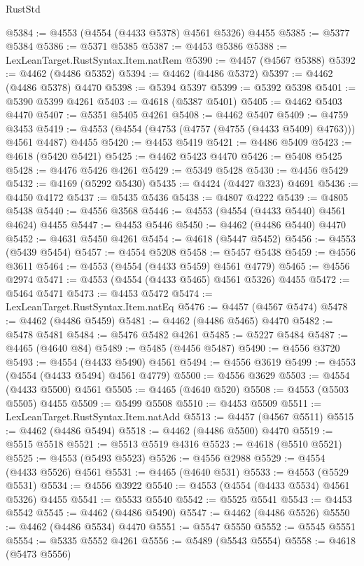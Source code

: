 \begin{lexlean}{RustStd}
\begin{coremodule}
@5384 := @4553 (@4554 (@4433 @5378) @4561 @5326) @4455
@5385 := @5377 @5384
@5386 := @5371 @5385
@5387 := @4453 @5386
@5388 := LexLeanTarget.RustSyntax.Item.natRem
@5390 := @4457 (@4567 @5388)
@5392 := @4462 (@4486 @5352)
@5394 := @4462 (@4486 @5372)
@5397 := @4462 (@4486 @5378) @4470
@5398 := @5394 @5397
@5399 := @5392 @5398
@5401 := @5390 @5399 @4261
@5403 := @4618 (@5387 @5401)
@5405 := @4462 @5403 @4470
@5407 := @5351 @5405 @4261
@5408 := @4462 @5407
@5409 := @4759 @3453
@5419 := @4553 (@4554 (@4753 (@4757 (@4755 (@4433 @5409) @4763))) @4561 @4487) @4455
@5420 := @4453 @5419
@5421 := @4486 @5409
@5423 := @4618 (@5420 @5421)
@5425 := @4462 @5423 @4470
@5426 := @5408 @5425
@5428 := @4476 @5426 @4261
@5429 := @5349 @5428
@5430 := @4456 @5429
@5432 := @4169 (@5292 @5430)
@5435 := @4424 (@4427 @323) @4691
@5436 := @4450 @4172
@5437 := @5435 @5436
@5438 := @4807 @4222
@5439 := @4805 @5438
@5440 := @4556 @3568
@5446 := @4553 (@4554 (@4433 @5440) @4561 @4624) @4455
@5447 := @4453 @5446
@5450 := @4462 (@4486 @5440) @4470
@5452 := @4631 @5450 @4261
@5454 := @4618 (@5447 @5452)
@5456 := @4553 (@5439 @5454)
@5457 := @4554 @5208
@5458 := @5457 @5438
@5459 := @4556 @3611
@5464 := @4553 (@4554 (@4433 @5459) @4561 @4779)
@5465 := @4556 @2974
@5471 := @4553 (@4554 (@4433 @5465) @4561 @5326) @4455
@5472 := @5464 @5471
@5473 := @4453 @5472
@5474 := LexLeanTarget.RustSyntax.Item.natEq
@5476 := @4457 (@4567 @5474)
@5478 := @4462 (@4486 @5459)
@5481 := @4462 (@4486 @5465) @4470
@5482 := @5478 @5481
@5484 := @5476 @5482 @4261
@5485 := @5227 @5484
@5487 := @4465 (@4640 @84)
@5489 := @5485 (@4456 @5487)
@5490 := @4556 @3720
@5493 := @4554 (@4433 @5490) @4561
@5494 := @4556 @3619
@5499 := @4553 (@4554 (@4433 @5494) @4561 @4779)
@5500 := @4556 @3629
@5503 := @4554 (@4433 @5500) @4561
@5505 := @4465 (@4640 @520)
@5508 := @4553 (@5503 @5505) @4455
@5509 := @5499 @5508
@5510 := @4453 @5509
@5511 := LexLeanTarget.RustSyntax.Item.natAdd
@5513 := @4457 (@4567 @5511)
@5515 := @4462 (@4486 @5494)
@5518 := @4462 (@4486 @5500) @4470
@5519 := @5515 @5518
@5521 := @5513 @5519 @4316
@5523 := @4618 (@5510 @5521)
@5525 := @4553 (@5493 @5523)
@5526 := @4556 @2988
@5529 := @4554 (@4433 @5526) @4561
@5531 := @4465 (@4640 @531)
@5533 := @4553 (@5529 @5531)
@5534 := @4556 @3922
@5540 := @4553 (@4554 (@4433 @5534) @4561 @5326) @4455
@5541 := @5533 @5540
@5542 := @5525 @5541
@5543 := @4453 @5542
@5545 := @4462 (@4486 @5490)
@5547 := @4462 (@4486 @5526)
@5550 := @4462 (@4486 @5534) @4470
@5551 := @5547 @5550
@5552 := @5545 @5551
@5554 := @5335 @5552 @4261
@5556 := @5489 (@5543 @5554)
@5558 := @4618 (@5473 @5556)

\end{coremodule}
\end{lexlean}

